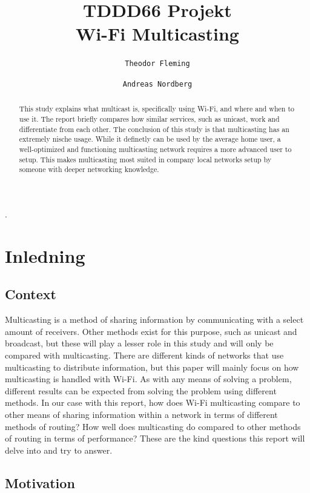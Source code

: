 \documentclass[9pt,a4paper]{acmproc}
\author{
  \texttt{Theodor Fleming}
  \and
  \texttt{Andreas Nordberg}
}
\begin{document}

\title{%
	TDDD66 Projekt \\
	\large Wi-Fi Multicasting}
\maketitle

\clearpage
.
\clearpage

\begin{abstract}

This study explains what multicast is, specifically using Wi-Fi, and where and when to use it. The report briefly compares how similar services, such as unicast, work and differentiate from each other. The conclusion of this study is that multicasting has an extremely nische usage. While it definetly can be used by the average home user, a well-optimized and functioning multicasting network requires a more advanced user to setup. This makes multicasting most suited in company local networks setup by someone with deeper networking knowledge.
\end{abstract}

\clearpage

\section{Inledning}

\subsection{Context}

Multicasting is a method of sharing information by communicating with a select amount of receivers. Other methods exist for this purpose, such as unicast and broadcast, but these will play a lesser role in this study and will only be compared with multicasting. There are different kinds of networks that use multicasting to distribute information, but this paper will mainly focus on how multicasting is handled with Wi-Fi. As with any means of solving a problem, different results can be expected from solving the problem using different methods. In our case with this report, how does Wi-Fi multicasting compare to other means of sharing information within a network in terms of different methods of routing? How well does multicasting do compared to other methods of routing in terms of performance? These are the kind questions this report will delve into and try to answer.  

\subsection{Motivation}
\end{document}
